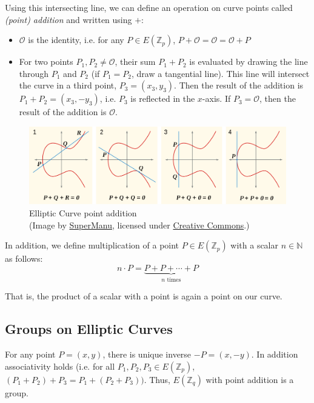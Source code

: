Using this intersecting line, we can define an operation on curve points called \emph{(point) addition} and written using $+$: \cite{katz_introduction_2015}

\begin{itemize}
    \item $\mathcal{O}$ is the identity, i.e. for any $P \in E(\mathbb{Z}_p)$, $P + \mathcal{O} = \mathcal{O} = \mathcal{O} + P$ 
    \item For two points $P_1, P_2 \neq \mathcal{O}$, their sum $P_1 + P_2$ is evaluated by drawing the line through $P_1$ and $P_2$ (if $P_1 = P_2$, draw a tangential line). 
        This line will intersect the curve in a third point, $P_3 = (x_3, y_3)$.
        Then the result of the addition is $P_1 + P_2 = (x_3, -y_3)$, i.e. $P_3$ is reflected in the $x$-axis.
        If $P_3 = \mathcal{O}$, then the result of the addition is $\mathcal{O}$.
\end{itemize}

\begin{figure}
    \includegraphics[width=\textwidth]{figures/ecc_point_addition.png}
    \caption{Elliptic Curve point addition\\(Image by \href{https://commons.wikimedia.org/wiki/File:ECClines.svg}{SuperManu}, licensed under \href{https://creativecommons.org/licenses/by-sa/3.0/deed.en}{Creative Commons}.)}
    \label{fig:ecc-point-addition}
\end{figure}

In addition, we define multiplication of a point $P \in E(\mathbb{Z}_p)$ with a scalar $n \in \mathbb{N}$ as follows:
\begin{equation}
    n \cdot P = \underbrace{P + P + \cdots + P}_{n \text{ times}}
\end{equation}
 
That is, the product of a scalar with a point is again a point on our curve.
\\

\subsection{Groups on Elliptic Curves}
For any point $P = (x,y)$, there is unique inverse $-P = (x, -y)$.
In addition associativity holds (i.e. for all $P_1, P_2, P_3 \in E(\mathbb{Z}_p)$, $(P_1 + P_2) + P_3 = P_1 + (P_2 + P_3))$.
Thus, $E(\mathbb{Z}_q)$ with point addition is a group. \cite{katz_introduction_2015}

